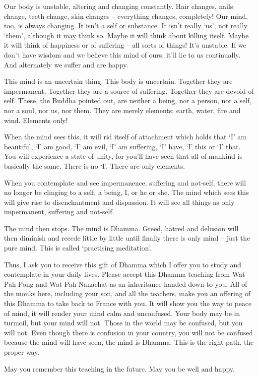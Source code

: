 Our body is unstable, altering and changing constantly. Hair changes, nails change, teeth change, skin changes -- everything changes, completely! Our mind, too, is always changing. It isn't a self or substance. It isn't really `us', not really `them', although it may think so. Maybe it will think about killing itself. Maybe it will think of happiness or of suffering -- all sorts of things! It's unstable. If we don't have wisdom and we believe this mind of ours, it'll lie to us continually. And alternately we suffer and are happy.

This mind is an uncertain thing. This body is uncertain. Together they are impermanent. Together they are a source of suffering. Together they are devoid of self. These, the Buddha pointed out, are neither a being, nor a person, nor a self, nor a soul, nor us, nor them. They are merely elements: earth, water, fire and wind. Elements only!

When the mind sees this, it will rid itself of attachment which holds that `I' am beautiful, `I' am good, `I' am evil, `I' am suffering, `I' have, `I' this or `I' that. You will experience a state of unity, for you'll have seen that all of mankind is basically the same. There is no `I'. There are only elements.

When you contemplate and see impermanence, suffering and not-self, there will no longer be clinging to a self, a being, I, or he or she. The mind which sees this will give rise to  disenchantment and dispassion. It will see all things as only impermanent, suffering and not-self.

The mind then stops. The mind is Dhamma. Greed, hatred and delusion will then diminish and recede little by little until finally there is only mind -- just the pure mind. This is called `practising meditation'.

Thus, I ask you to receive this gift of Dhamma which I offer you to study and contemplate in your daily lives. Please accept this Dhamma teaching from Wat Pah Pong and Wat Pah Nanachat as an inheritance handed down to you. All of the monks here, including your son, and all the teachers, make you an offering of this Dhamma to take back to France with you. It will show you the way to peace of mind, it will render your mind calm and unconfused. Your body may be in turmoil, but your mind will not. Those in the world may be confused, but you will not. Even though there is confusion in your country, you will not be confused because the mind will have seen, the mind is Dhamma. This is the right path, the proper way.

May you remember this teaching in the future. May you be well and happy.


